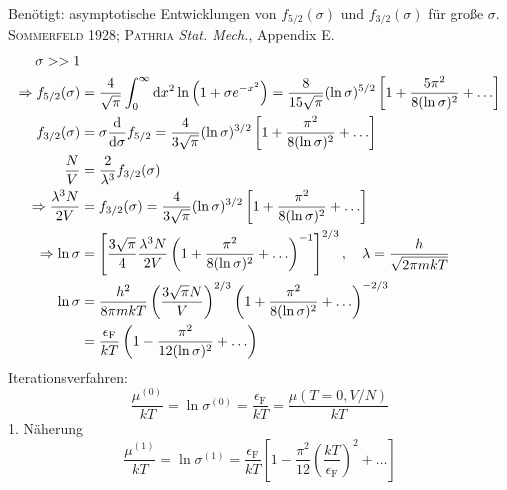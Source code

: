 \begin{enumerate}[A)]
\begin{enumerate}[i)]
        Benötigt: asymptotische Entwicklungen von $f_{5/2}(\sigma)$ und $f_{3/2}(\sigma)$ für große $\sigma$. \\
        \textsc{Sommerfeld} 1928; \textsc{Pathria} \emph{Stat. Mech.}, Appendix E. \\
        \begin{equation}
            \begin{split}
                \sigma >> 1 & \\ 
                \Rightarrow f_{5/2} (\sigma) &= \frac{4}{\sqrt{\pi}} \int_0^\infty \mathrm{d} x^2 \ln \left( 1 + \sigma e^{-x^2} \right) = \frac{8}{15 \sqrt{\pi}} (\ln \sigma)^{5/2} \left[ 1 + \frac{5 \pi^2}{8 (\ln \sigma)^2} + \ldots \right] \\
                f_{3/2}(\sigma) &= \sigma \frac{\mathrm{d}}{\mathrm{d} \sigma} f_{5/2} = \frac{4}{3 \sqrt{\pi}} (\ln \sigma)^{3/2} \left[ 1 + \frac{\pi^2}{8 (\ln \sigma)^2} + \ldots \right] \\
                \frac{N}{V} &= \frac{2}{\lambda^3} f_{3/2}(\sigma) \\ 
                \Rightarrow \frac{\lambda^3 N}{2 V} &= f_{3/2}(\sigma) = \frac{4}{3 \sqrt{\pi}} (\ln \sigma)^{3/2} \left[ 1 + \frac{\pi^2}{8 (\ln \sigma)^2} + \ldots \right] \\
                \Rightarrow \ln \sigma &= \left[ \frac{3 \sqrt{\pi}}{4} \frac{\lambda^3 N}{2 V} \left( 1 + \frac{\pi^2}{8 (\ln \sigma)^2} + \ldots \right)^{-1} \right]^{2/3}, \quad \lambda = \frac{h}{\sqrt{2 \pi m k T}} \\
                \ln \sigma &= \frac{h^2}{8 \pi m k T} \left( \frac{3 \sqrt{\pi }N}{V} \right)^{2/3} \left( 1 + \frac{\pi^2}{8 (\ln \sigma)^2} + \ldots \right)^{-2/3} \\
                &= \frac{\epsilon_\text{F}}{k T} \left( 1 - \frac{\pi^2}{12 (\ln \sigma)^2} + \ldots \right) 
            \end{split}
        \end{equation}
        Iterationsverfahren:
        \begin{equation}
            \frac{\mu^{(0)}}{k T} = \ln \sigma^{(0)} = \frac{\epsilon_\text{F}}{k T} = \frac{\mu (T=0, V/N)}{k T}
        \end{equation}
        1. Näherung
        \begin{equation}
            \frac{\mu^{(1)}}{k T} = \ln \sigma^{(1)} = \frac{\epsilon_\text{F}}{k T} \left[ 1 - \frac{\pi^2}{12} \left( \frac{k T}{\epsilon_\text{F}} \right)^2 + \ldots \right]
        \end{equation}

\end{enumerate}
\end{enumerate}
